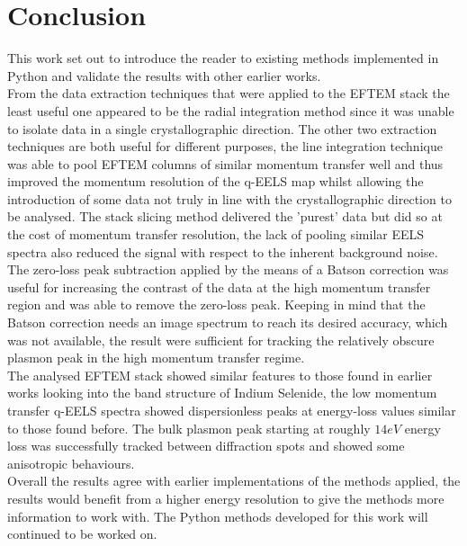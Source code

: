 \section{Conclusion}
\label{chap:conclusion}%
%
This work set out to introduce the reader to existing methods implemented in Python and validate the results with other earlier works.\\
From the data extraction techniques that were applied to the EFTEM stack the least useful one appeared to be the radial integration method since it was unable to isolate data in a single crystallographic direction. The other two extraction techniques are both useful for different purposes, the line integration technique was able to pool EFTEM columns of similar momentum transfer well and thus improved the momentum resolution of the q-EELS map whilst allowing the introduction of some data not truly in line with the crystallographic direction to be analysed. The stack slicing method delivered the 'purest' data but did so at the cost of momentum transfer resolution, the lack of pooling similar EELS spectra also reduced the signal with respect to the inherent background noise.\\
The zero-loss peak subtraction applied by the means of a Batson correction was useful for increasing the contrast of the data at the high momentum transfer region and was able to remove the zero-loss peak. Keeping in mind that the Batson correction needs an image spectrum to reach its desired accuracy, which was not available, the result were sufficient for tracking the relatively obscure plasmon peak in the high momentum transfer regime.\\
The analysed EFTEM stack showed similar features to those found in earlier works looking into the band structure of Indium Selenide, the low momentum transfer q-EELS spectra showed dispersionless peaks at energy-loss values similar to those found before. The bulk plasmon peak starting at roughly $14eV$ energy loss was successfully tracked between diffraction spots and showed some anisotropic behaviours.\\
Overall the results agree with earlier implementations of the methods applied, the results would benefit from a higher energy resolution to give the methods more information to work with. The Python methods developed for this work will continued to be worked on.